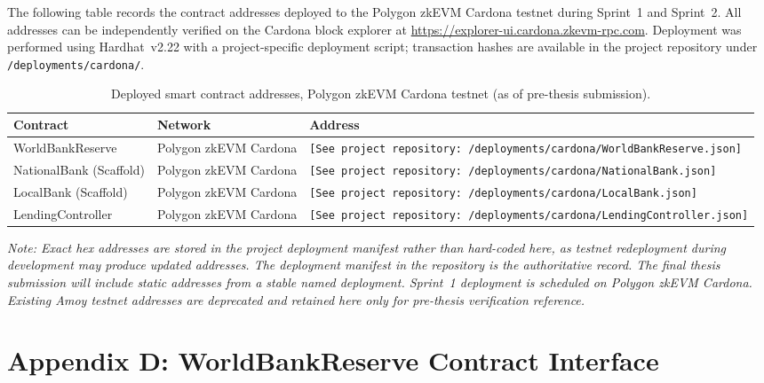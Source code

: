 \documentclass[12pt,a4paper]{report}
\newcommand{\tableheadcolor}{\rowcolor{black!8}}
\newcommand{\tableheadfont}{\bfseries\small}
\begin{document}
The following table records the contract addresses deployed to the Polygon zkEVM Cardona testnet during Sprint~1 and Sprint~2. All addresses can be independently verified on the Cardona block explorer at \url{https://explorer-ui.cardona.zkevm-rpc.com}. Deployment was performed using Hardhat~v2.22 with a project-specific deployment script; transaction hashes are available in the project repository under \texttt{/deployments/cardona/}.

\begin{table}[H]
\centering
\caption{Deployed smart contract addresses, Polygon zkEVM Cardona testnet (as of pre-thesis submission).}
\renewcommand{\arraystretch}{1.35}
\small
\begin{tabular}{@{}llp{5.5cm}@{}}
\toprule
\tableheadcolor
\tableheadfont Contract & \tableheadfont Network & \tableheadfont Address \\
\midrule
WorldBankReserve & Polygon zkEVM Cardona & \texttt{[See project repository: /deployments/cardona/WorldBankReserve.json]} \\
\rowcolor{RowShade}
NationalBank (Scaffold) & Polygon zkEVM Cardona & \texttt{[See project repository: /deployments/cardona/NationalBank.json]} \\
LocalBank (Scaffold) & Polygon zkEVM Cardona & \texttt{[See project repository: /deployments/cardona/LocalBank.json]} \\
\rowcolor{RowShade}
LendingController & Polygon zkEVM Cardona & \texttt{[See project repository: /deployments/cardona/LendingController.json]} \\
\bottomrule
\end{tabular}
\end{table}

\noindent\textit{Note: Exact hex addresses are stored in the project deployment manifest rather than hard-coded here, as testnet redeployment during development may produce updated addresses. The deployment manifest in the repository is the authoritative record. The final thesis submission will include static addresses from a stable named deployment. Sprint~1 deployment is scheduled on Polygon zkEVM Cardona. Existing Amoy testnet addresses are deprecated and retained here only for pre-thesis verification reference.}


\chapter*{Appendix D: WorldBankReserve Contract Interface}
{}
\end{document}
